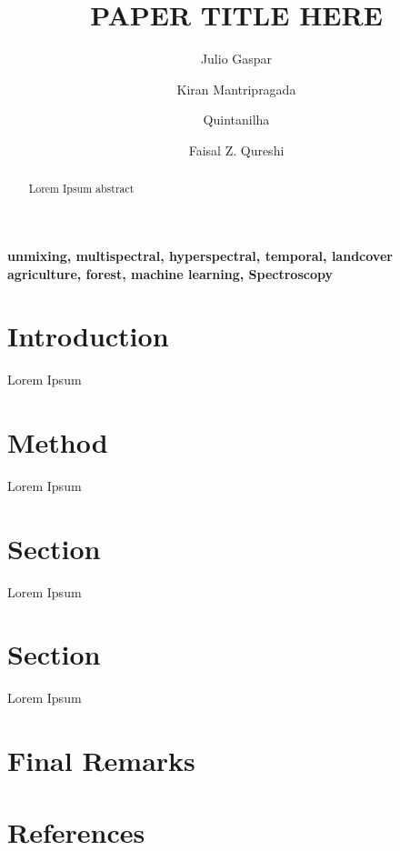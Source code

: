 \documentclass[review]{elsarticle}
\begin{document}
\begin{frontmatter}

\title{PAPER TITLE HERE}


\author[address_1, address_2]{Julio Gaspar}

\author[address_2]{Kiran Mantripragada}

\author[address_1]{Quintanilha}

\author[address_2]{Faisal Z. Qureshi}


\address[address_1]{Politechnic School of University of São Paulo, Department of Civil Engineering}
\address[address_2]{Ontario Tech University, Faculty of Sciences, Computer Vision Lab}


\begin{abstract}
    Lorem Ipsum abstract
\end{abstract}

\begin{keyword}
    \textbf{unmixing, multispectral, hyperspectral, temporal, landcover
    agriculture, forest, machine learning, Spectroscopy}
\end{keyword}

\end{frontmatter}

\linenumbers

\section{Introduction}
Lorem Ipsum


\section{Method}
Lorem Ipsum


\section{Section}
Lorem Ipsum


\section{Section}
Lorem Ipsum

\section{Final Remarks}


\nocite{*}
\section*{References}


\end{document}
